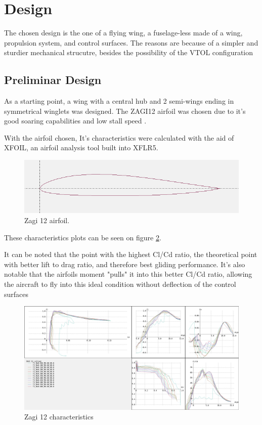 \section{Design}

The chosen design is the one of a flying wing, a fuselage-less made of a wing, propulsion system, and control surfaces. The reasons are because of a simpler and sturdier mechanical strucutre, besides the possibility of the VTOL configuration

\subsection{Preliminar Design}

As a starting point, a wing with a central hub and 2 semi-wings ending in symmetrical winglets was designed. The ZAGI12 airfoil was chosen due to it's good soaring capabilities and low stall speed .

With the airfoil chosen, It's characteristics were calculated with the aid of XFOIL, an airfoil analysis tool built into XFLR5.

\begin{figure}
\centering
  \includegraphics[width=\linewidth]{figs/zagi12.png}
  \caption{Zagi 12 airfoil.}
  \label{fig:zagi12}
\end{figure}


These characteristics plots can be seen on figure \ref{fig:zagi12polares}.
%

It can be noted that the point with the highest Cl/Cd ratio, the theoretical point with better lift to drag ratio, and therefore best gliding performance. It's also notable that the airfoils moment "pulls" it into this better Cl/Cd ratio, allowing the aircraft to fly into this ideal condition without deflection of the control surfaces


\begin{figure}
\centering
  \includegraphics[width=\linewidth]{figs/polares.png}
  \caption{Zagi 12 characteristics}
  \label{fig:zagi12polares}
\end{figure}

